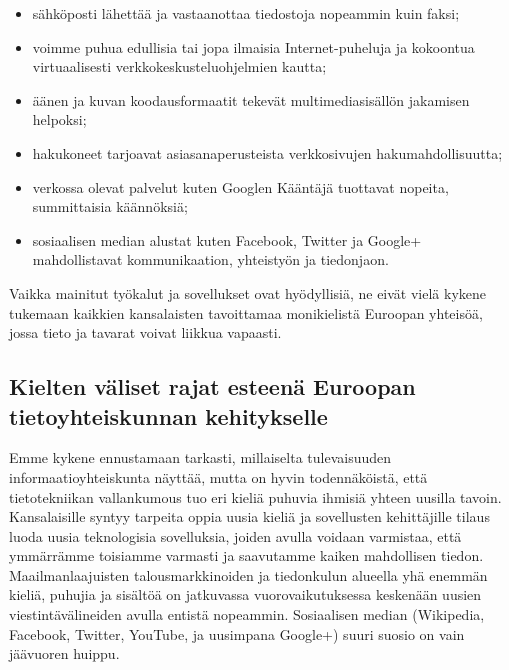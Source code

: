 \documentclass[]{../../metanetpaper}
\begin{document}
\begin{multicols}{2}
\begin{itemize}
\item sähköposti lähettää ja vastaanottaa tiedostoja nopeammin kuin faksi;

\item voimme puhua edullisia tai jopa ilmaisia Internet-puheluja ja kokoontua
virtuaalisesti verkkokeskusteluohjelmien kautta;

\item äänen ja kuvan koodausformaatit tekevät multimediasisällön jakamisen helpoksi;

\item hakukoneet tarjoavat asiasanaperusteista verkkosivujen hakumahdollisuutta;

\item verkossa olevat palvelut kuten Googlen Kääntäjä tuottavat nopeita, summittaisia
käännöksiä;

\item sosiaalisen median alustat kuten Facebook, Twitter ja Google+ mahdollistavat
kommunikaation, yhteistyön ja tiedonjaon.
\end{itemize}
Vaikka mainitut työkalut ja sovellukset ovat hyödyllisiä, ne eivät vielä kykene
tukemaan kaikkien kansalaisten tavoittamaa monikielistä Euroopan yhteisöä,
jossa tieto ja tavarat voivat liikkua vapaasti.


\subsection{Kielten väliset rajat esteenä Euroopan tietoyhteiskunnan kehitykselle}


Emme kykene ennustamaan tarkasti, millaiselta tulevaisuuden
informaatioyhteiskunta näyttää, mutta on hyvin todennäköistä, että
tietotekniikan vallankumous tuo eri kieliä puhuvia ihmisiä yhteen uusilla
tavoin. Kansalaisille syntyy tarpeita oppia uusia kieliä ja sovellusten
kehittäjille tilaus luoda uusia teknologisia sovelluksia, joiden avulla voidaan 
varmistaa, että ymmärrämme toisiamme varmasti ja saavutamme kaiken mahdollisen tiedon.
Maailmanlaajuisten talousmarkkinoiden ja tiedonkulun alueella yhä enemmän
kieliä, puhujia ja sisältöä on jatkuvassa vuorovaikutuksessa keskenään uusien
viestintävälineiden avulla entistä nopeammin. Sosiaalisen median (Wikipedia,
Facebook, Twitter, YouTube, ja uusimpana Google+) suuri suosio on vain
jäävuoren huippu.


\end{multicols}
\end{document}
